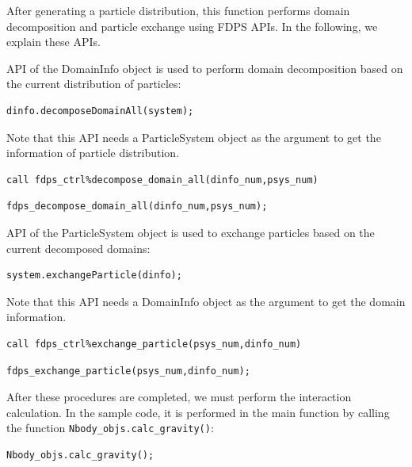 After generating a particle distribution, this function performs domain decomposition and particle exchange using FDPS APIs. In the following, we explain these APIs.

API  of the \textsf{DomainInfo} object is used to perform domain decomposition based on the current distribution of particles:
\ifCpp
\begin{lstlisting}[caption=Domain Decomposition]
dinfo.decomposeDomainAll(system);
\end{lstlisting}
Note that this API needs a \textsf{ParticleSystem} object as the argument to get the information of particle distribution.
\endifCpp
\ifFtn
\begin{lstlisting}[caption=Domain Decomposition]
call fdps_ctrl%decompose_domain_all(dinfo_num,psys_num)
\end{lstlisting}
\endifFtn
\ifC
\begin{lstlisting}[caption=Domain Decomposition]
fdps_decompose_domain_all(dinfo_num,psys_num);
\end{lstlisting}
\endifC


API  of the \textsf{ParticleSystem} object is used to exchange particles based on the current decomposed domains:
\ifCpp
\begin{lstlisting}[caption=Particle Exchange]
system.exchangeParticle(dinfo);
\end{lstlisting}
Note that this API needs a \textsf{DomainInfo} object as the argument to get the domain information.
\endifCpp
\ifFtn
\begin{lstlisting}[caption=Particle Exchange]
call fdps_ctrl%exchange_particle(psys_num,dinfo_num)
\end{lstlisting}
\endifFtn
\ifC
\begin{lstlisting}[caption=Particle Exchange]
fdps_exchange_particle(psys_num,dinfo_num);
\end{lstlisting}
\endifC



After these procedures are completed, we must perform the interaction calculation.
\ifCpp
In the sample code, it is performed in the main function by calling the function \texttt{Nbody\_objs.calc\_gravity()}:
\begin{lstlisting}[caption=Execution of interaction calculation]
Nbody_objs.calc_gravity();
\end{lstlisting}

